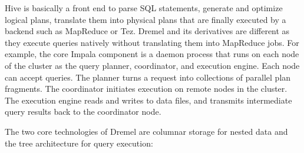 \documentclass[11pt]{book}
\begin{document}
Hive is basically a front end to parse SQL statements, generate and optimize logical plans, translate them into physical plans that are finally executed by a backend such as MapReduce or Tez. Dremel and its derivatives are different as they execute queries natively without translating them into MapReduce jobs. For example, the core Impala component is a daemon process that runs on each node of the cluster as the query planner, coordinator, and execution engine. Each node can accept queries. The planner turns a request into collections of parallel plan fragments. The coordinator initiates execution on remote nodes in the cluster. The execution engine reads and writes to data files, and transmits intermediate query results back to the coordinator node.

The two core technologies of Dremel are columnar storage for nested data and the tree architecture for query execution:
\end{document}
